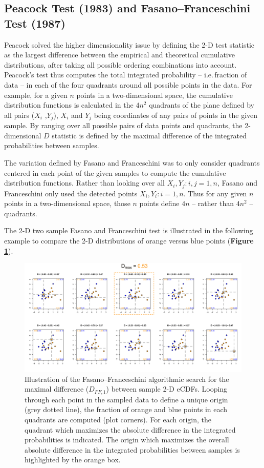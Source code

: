 \documentclass[codesnippet]{jss}
\begin{document}
\subsection{Peacock Test (1983) and Fasano--Franceschini Test (1987)}
Peacock solved the higher dimensionality issue by defining the 2-D test statistic as the largest difference between the empirical and theoretical cumulative distributions, after taking all possible ordering combinations into account. Peacock's test thus computes the total integrated probability -- i.e.\,fraction of data -- in each of the four quadrants around all possible points in the data. For example, for a given $n$ points in a two-dimensional space, the cumulative distribution functions is calculated in the $4n^2$ quadrants of the plane defined by all pairs ($X_i$ ,$Y_j$), $X_i$ and $Y_j$ being coordinates of any pairs of points in the given sample. By ranging over all possible pairs of data points and quadrants, the 2-dimensional $D$ statistic is defined by the maximal difference of the integrated probabilities between samples.

The variation defined by Fasano and Franceschini was to only consider quadrants centered in each point of the given samples to compute the cumulative distribution functions.  Rather than looking over all $X_i, Y_j: i,j={1,n}$, Fasano and Franceschini only used the detected points $X_i, Y_i : i={1,n}$. Thus for any given $n$ points in a two-dimensional space, those $n$ points define $4n$ -- rather than $4n^2$ -- quadrants.

The 2-D two sample Fasano and Franceschini test is illustrated in the following example to compare the 2-D distributions of orange versus blue points (\textbf{Figure \ref{fig:kstest2D}}).

\begin{figure}[t!]
\centering
\includegraphics{fftestOutput}
\caption{\label{fig:kstest2D} Illustration of the Fasano--Franceschini algorithmic search for the maximal difference ($D_{FF,1}$) between sample 2-D eCDFs. Looping through each point in the sampled data to define a unique origin (grey dotted line), the fraction of orange and blue points in each quadrants are computed (plot corners). For each origin, the quadrant which maximizes the absolute difference in the integrated probabilities is indicated. The origin which maximizes the overall absolute difference in the integrated probabilities between samples is highlighted by the orange box.
}
\end{figure}
\end{document}
